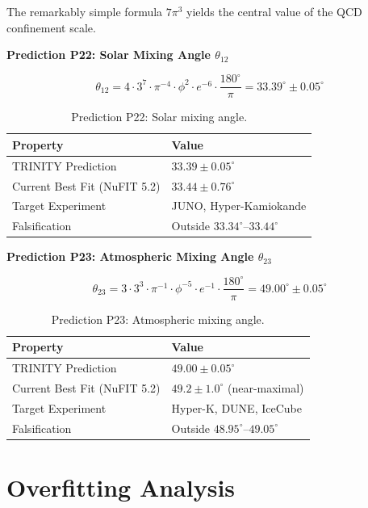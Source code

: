 \documentclass[aps,prd,preprint,superscriptaddress,showpacs,nofootinbib,longbibliography]{revtex4-2}
\begin{document}
The remarkably simple formula $7\pi^3$ yields the central value of the QCD confinement scale.

\textbf{Prediction P22: Solar Mixing Angle $\theta_{12}$}

\begin{equation}
\theta_{12} = 4 \cdot 3^7 \cdot \pi^{-4} \cdot \phi^2 \cdot e^{-6} \cdot \frac{180^\circ}{\pi} = 33.39^\circ \pm 0.05^\circ
\end{equation}

\begin{table}[h]
\centering
\begin{tabular}{ll}
\toprule
Property & Value \\
\midrule
TRINITY Prediction & $33.39 \pm 0.05^\circ$ \\
Current Best Fit (NuFIT 5.2) & $33.44 \pm 0.76^\circ$ \\
Target Experiment & JUNO, Hyper-Kamiokande \\
Falsification & Outside $33.34^\circ$--$33.44^\circ$ \\
\bottomrule
\end{tabular}
\caption{Prediction P22: Solar mixing angle.}
\end{table}

\textbf{Prediction P23: Atmospheric Mixing Angle $\theta_{23}$}

\begin{equation}
\theta_{23} = 3 \cdot 3^3 \cdot \pi^{-1} \cdot \phi^{-5} \cdot e^{-1} \cdot \frac{180^\circ}{\pi} = 49.00^\circ \pm 0.05^\circ
\end{equation}

\begin{table}[h]
\centering
\begin{tabular}{ll}
\toprule
Property & Value \\
\midrule
TRINITY Prediction & $49.00 \pm 0.05^\circ$ \\
Current Best Fit (NuFIT 5.2) & $49.2 \pm 1.0^\circ$ (near-maximal) \\
Target Experiment & Hyper-K, DUNE, IceCube \\
Falsification & Outside $48.95^\circ$--$49.05^\circ$ \\
\bottomrule
\end{tabular}
\caption{Prediction P23: Atmospheric mixing angle.}
\end{table}

\section{Overfitting Analysis}
\label{sec:overfitting}
\end{document}
